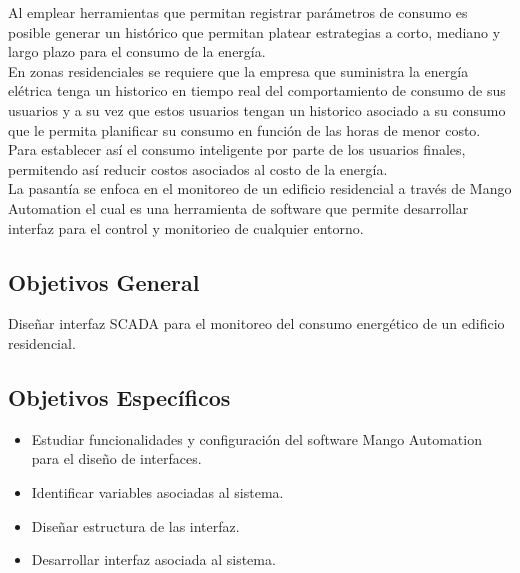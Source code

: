     Al emplear herramientas que permitan registrar parámetros de consumo es posible generar un histórico que permitan 
    platear estrategias a corto, mediano y largo plazo para el consumo de la energía.\\


    En zonas residenciales se requiere que la empresa que suministra la energía elétrica tenga un historico en tiempo real 
    del comportamiento de consumo de sus usuarios y a su vez que estos usuarios tengan un historico asociado a su consumo 
    que le permita planificar su consumo en función de las horas de menor costo. Para establecer así el consumo inteligente 
    por parte de los usuarios finales, permitendo así reducir costos asociados al costo de la energía.\\
        
    La pasantía se enfoca en el monitoreo de un edificio residencial a través de Mango Automation el cual es una herramienta
    de software que permite desarrollar interfaz para el control y monitorieo de cualquier entorno.

\subsection{Objetivos General}
    Diseñar interfaz SCADA para el 
    monitoreo del consumo energético de un 
    edificio residencial.

\subsection{Objetivos Específicos}
\begin{itemize}
    \item Estudiar funcionalidades y configuración
    del software Mango Automation para el diseño de 
    interfaces.
    \item Identificar variables asociadas al sistema.
    \item Diseñar estructura de las interfaz.
    \item Desarrollar interfaz asociada al sistema.
\end{itemize}
\newpage